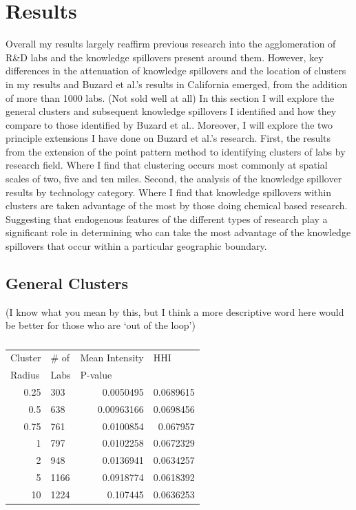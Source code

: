 \documentclass[12pt,letterpaper]{article}
\begin{document}
\section{Results}
Overall my results largely reaffirm previous research into the agglomeration of R\&D labs and the knowledge spillovers present around them. However, key differences in the attenuation of knowledge spillovers and the location of clusters in my results and Buzard et al.'s results in California emerged, from the addition of more than 1000 labs. {\color{red}(Not sold well at all)}
In this section I will explore the general clusters and subsequent knowledge spillovers I identified and how they compare to those identified by Buzard et al.. Moreover, I will explore the two principle extensions I have done on Buzard et al.'s research. First, the results from the extension of the point pattern method to identifying clusters of labs by research field. Where I find that clustering occurs most commonly at spatial scales of two, five and ten miles. Second, the analysis of the knowledge spillover results by technology category. Where I find that knowledge spillovers within clusters are taken advantage of the most by those doing chemical based research. Suggesting that endogenous features of the different types of research play a significant role in determining who can take the most advantage of the knowledge spillovers that occur within a particular geographic boundary.  
\subsection{General Clusters} {\color{red}(I know what you mean by this, but I think a more descriptive word here would be better for those who are `out of the loop')}
\begin{table}[H]
\centering
\begin{tabular}{rlrr}
\hline
\multicolumn{1}{l}{Cluster} & \# of & \multicolumn{1}{l}{Mean Intensity} & \multicolumn{1}{l}{HHI} \\
\multicolumn{1}{l}{Radius}  & Labs  & \multicolumn{1}{l}{P-value}        & \multicolumn{1}{l}{}    \\ \hline
0.25 & 303  & 0.0050495  & 0.0689615 \\
0.5  & 638  & 0.00963166 & 0.0698456 \\
0.75 & 761  & 0.0100854  & 0.067957  \\
1    & 797  & 0.0102258  & 0.0672329 \\
2    & 948  & 0.0136941  & 0.0634257 \\
5    & 1166 & 0.0918774  & 0.0618392 \\
10   & 1224 & 0.107445   & 0.0636253 \\ \hline
\end{tabular}
\caption{}
\label{tab:tab1}
\end{table}
\end{document}
